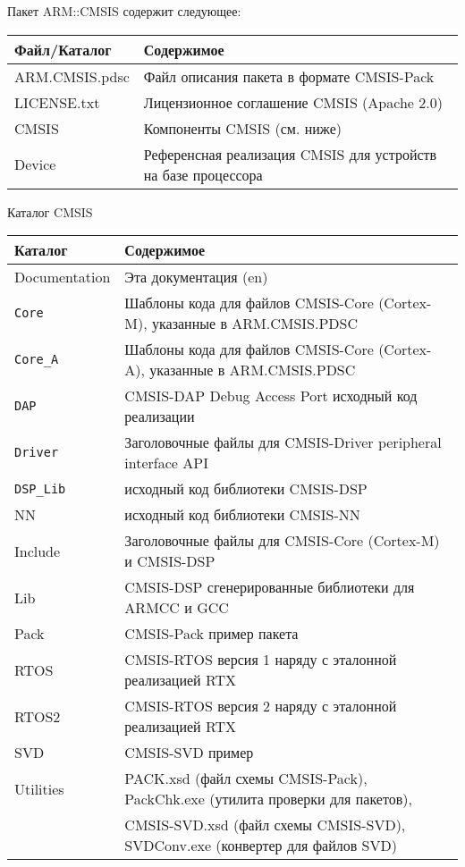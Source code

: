 \pagebreak
{}

Пакет ARM::CMSIS содержит следующее:

\bigskip
\begin{tabular}{l l}
Файл/Каталог 	& Содержимое \\
\hline
ARM.CMSIS.pdsc	& Файл описания пакета в формате CMSIS-Pack \\
LICENSE.txt	& Лицензионное соглашение CMSIS (Apache 2.0) \\
CMSIS	& Компоненты CMSIS (см. ниже) \\
Device	& Референсная реализация CMSIS для устройств на базе процессора
\cm{\rcirc}\\
\end{tabular}

\bigskip
\noindent
Каталог CMSIS

\bigskip
\begin{tabular}{l l}
Каталог 	& Содержимое \\
\hline
Documentation	& Эта документация (en) \\
\verb|Core|	& Шаблоны кода для файлов CMSIS-Core (Cortex-M),
указанные в ARM.CMSIS.PDSC
\\
\verb|Core_A|	& Шаблоны кода для файлов CMSIS-Core (Cortex-A),
указанные в ARM.CMSIS.PDSC \\
\verb|DAP|	& CMSIS-DAP Debug Access Port исходный код реализации \\
\verb|Driver|	& Заголовочные файлы для CMSIS-Driver peripheral interface API \\
\verb|DSP_Lib|	& исходный код библиотеки CMSIS-DSP \\
NN	& исходный код библиотеки CMSIS-NN \\
Include	& Заголовочные файлы для CMSIS-Core (Cortex-M) и CMSIS-DSP \\
Lib	& CMSIS-DSP сгенерированные библиотеки для ARMCC и GCC
\\
Pack	& CMSIS-Pack пример пакета \\
RTOS	& CMSIS-RTOS версия 1 наряду с эталонной реализацией RTX \\
RTOS2	& CMSIS-RTOS версия 2 наряду с эталонной реализацией RTX \\
SVD	& CMSIS-SVD пример \\
Utilities	& PACK.xsd (файл схемы CMSIS-Pack), PackChk.exe (утилита
проверки для пакетов),\\&
CMSIS-SVD.xsd (файл схемы CMSIS-SVD), SVDConv.exe (конвертер для
файлов SVD)
\\
\end{tabular}
